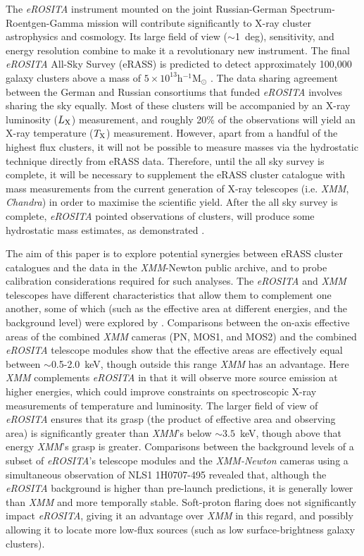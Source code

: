 \documentclass[fleqn,usenatbib]{mnras}
\begin{document}
The {\em eROSITA} instrument mounted on the joint Russian-German Spectrum-Roentgen-Gamma \citep[SRG,][]{missionpaper} mission will contribute significantly to X-ray cluster astrophysics and cosmology. Its large field of view (${\sim}$1~deg), sensitivity, and energy resolution combine to make it a revolutionary new instrument. The final {\em eROSITA} All-Sky Survey (eRASS) is predicted to detect approximately 100,000 galaxy clusters above a mass of $5\times10^{13}$h$^{-1}$M$_{\odot}$ \citep[][]{erass_numclusters}. The data sharing agreement between the German and Russian consortiums that funded {\em eROSITA} involves sharing the sky equally. Most of these clusters will be accompanied by an X-ray luminosity ($L_{\rm X}$) measurement, and roughly 20\% \citep[][]{efedsclustercat} of the observations will yield an X-ray temperature ($T_{\rm X}$) measurement. However, apart from a handful of the highest flux clusters, it will not be possible to measure masses via the hydrostatic technique directly from eRASS data. Therefore, until the all sky survey is complete, it will be necessary to supplement the eRASS cluster catalogue with mass measurements from the current generation of X-ray telescopes (i.e. {\em XMM}, {\em Chandra}) in order to maximise the scientific yield. After the all sky survey is complete, {\em eROSITA} pointed observations of clusters, will produce some hydrostatic mass estimates, as demonstrated \cite{pointysanders}.

The aim of this paper is to explore potential synergies between eRASS cluster catalogues and the data in the {\em XMM}-Newton public archive, and to probe calibration considerations required for such analyses. The {\em eROSITA} and {\em XMM} telescopes have different characteristics that allow them to complement one another, some of which (such as the effective area at different energies, and the background level) were explored by \cite{missionpaper}. Comparisons between the on-axis effective areas of the combined {\em XMM} cameras (PN, MOS1, and MOS2) and the combined {\em eROSITA} telescope modules show that the effective areas are effectively equal between ${\sim}$0.5-2.0~keV, though outside this range {\em XMM} has an advantage. Here {\em XMM} complements {\em eROSITA} in that it will observe more source emission at higher energies, which could improve constraints on spectroscopic X-ray measurements of temperature and luminosity. The larger field of view of {\em eROSITA} ensures that its grasp (the product of effective area and observing area) is significantly greater than {\em XMM}'s below ${\sim}3.5$~keV, though above that energy {\em XMM}'s grasp is greater. Comparisons between the background levels of a subset of {\em eROSITA}'s telescope modules and the {\em XMM-Newton} cameras using a simultaneous observation of NLS1 1H0707-495 \citep[][]{simulback} revealed that, although the {\em eROSITA} background is higher than pre-launch predictions, it is generally lower than {\em XMM} and more temporally stable. Soft-proton flaring does not significantly impact {\em eROSITA}, giving it an advantage over {\em XMM} in this regard, and possibly allowing it to locate more low-flux sources (such as low surface-brightness galaxy clusters).
\end{document}
